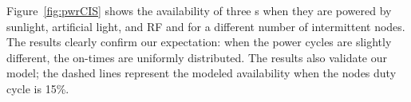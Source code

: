 %
%
Figure~\ref{fig:pwrCIS} shows the availability of three \cis{}s when they are powered by sunlight, artificial light, and RF and for a different number of intermittent nodes.
The results clearly confirm our expectation: when the power cycles are slightly different, the on-times are uniformly distributed. The results also validate our model; the dashed lines represent the modeled availability when the nodes duty cycle is 15\%.
%
